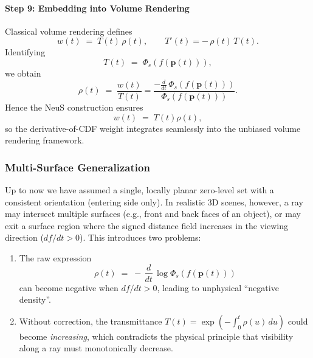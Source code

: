 \begin{enrichment}
\begin{enrichment}
        \paragraph{Step 9: Embedding into Volume Rendering}
        Classical volume rendering defines
        \[
        w(t) \;=\; T(t)\,\rho(t), 
        \qquad
        T'(t) = -\,\rho(t)\,T(t).
        \]
        Identifying
        \begin{equation}
            T(t) \;=\; \Phi_s(f(\mathbf{p}(t))),
        \end{equation}
        we obtain
        \begin{equation}
            \rho(t) \;=\; \frac{w(t)}{T(t)}
            = \frac{-\tfrac{d}{dt}\,\Phi_s(f(\mathbf{p}(t)))}{\Phi_s(f(\mathbf{p}(t)))}.
        \end{equation}
        Hence the NeuS construction ensures
        \[
        w(t) \;=\; T(t)\rho(t),
        \]
        so the derivative-of-CDF weight integrates seamlessly into the unbiased
        volume rendering framework.
        
        \subsubsection{Multi-Surface Generalization}
        \label{subsubsec:chapter23_neus_multisurface}
        
        Up to now we have assumed a single, locally planar zero-level set with a consistent orientation (entering side only). In realistic 3D scenes, however, a ray may intersect multiple surfaces (e.g., front and back faces of an object), or may exit a surface region where the signed distance field increases in the viewing direction (\(df/dt > 0\)). This introduces two problems:
        \begin{enumerate}
            \item The raw expression
            \[
            \rho(t) \;=\; -\,\frac{d}{dt}\,\log \Phi_s(f(\mathbf{p}(t)))
            \]
            can become negative when \(df/dt > 0\), leading to unphysical “negative density”.
            \item Without correction, the transmittance \(T(t) = \exp\!\left(-\int_0^t \rho(u)\,du\right)\) could become \emph{increasing}, which contradicts the physical principle that visibility along a ray must monotonically decrease.
        \end{enumerate}
        

\end{enrichment}
\end{enrichment}
